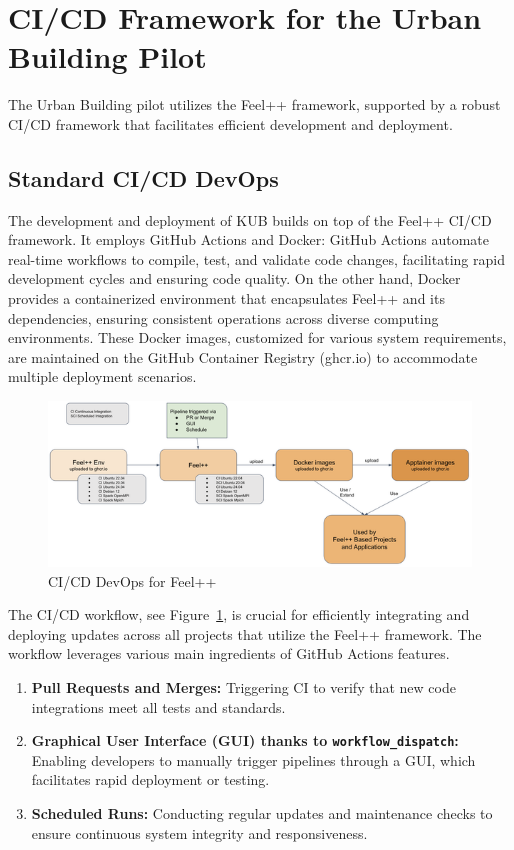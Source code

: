 \documentclass[runningheads]{llncs}
\begin{document}
\section{CI/CD Framework for the Urban Building Pilot}
The Urban Building pilot utilizes the Feel++ framework, supported by a robust CI/CD framework that facilitates efficient development and deployment. %

\subsection{Standard CI/CD DevOps}
The development and deployment of KUB builds on top of the Feel++ CI/CD framework. It employs GitHub Actions and Docker: GitHub Actions automate real-time workflows to compile, test, and validate code changes, facilitating rapid development cycles and ensuring code quality. On the other hand, Docker provides a containerized environment that encapsulates Feel++ and its dependencies, ensuring consistent operations across diverse computing environments. These Docker images, customized for various system requirements, are maintained on the GitHub Container Registry (ghcr.io) to accommodate multiple deployment scenarios.

\begin{figure}
    \centering
    \includegraphics[width=\textwidth]{img-compressed-feelpp-devops.png}
    \caption{CI/CD DevOps for Feel++}
    \label{fig:feelpp-devops}
\end{figure}
The CI/CD workflow, see Figure~\ref{fig:feelpp-devops}, is crucial for efficiently integrating and deploying updates across all projects that utilize the Feel++ framework. The workflow leverages various main ingredients of GitHub Actions features.
\begin{enumerate}
    \item \textbf{Pull Requests and Merges:} Triggering CI to verify that new code integrations meet all tests and standards.
    \item \textbf{Graphical User Interface (GUI) thanks to \texttt{workflow\_dispatch}:} Enabling developers to manually trigger pipelines through a GUI, which facilitates rapid deployment or testing. 
    \item \textbf{Scheduled Runs:} Conducting regular updates and maintenance checks to ensure continuous system integrity and responsiveness.
\end{enumerate}
\end{document}
